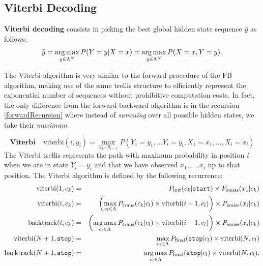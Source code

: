 %


\subsection{Viterbi Decoding}

\textbf{Viterbi decoding} consists in
picking the best global hidden state sequence 
$\widehat{y}$
as follows: 
\begin{equation}
\widehat{y} = \operatorname*{arg\,max}_{y \in \Lambda^N} P(Y=y|X=x) = \operatorname*{arg\,max}_{y \in \Lambda^N} P(X=x,Y=y).
\end{equation}

The Viterbi algorithm 
is very similar to the forward procedure of the FB algorithm,
making use of the same trellis structure to efficiently represent the exponential number of sequences without prohibitive computation costs. In fact, the only
difference from the forward-backward algorithm is in the recursion
\ref{forwardRecursion} where instead of \emph{summing} over all possible 
hidden states, we take their \emph{maximum}.

\begin{equation}
\label{eq::viterbi}
\mathbf{Viterbi }\;\;\;\;  \mathrm{viterbi}(i, y_i) = \max_{y_1...y_{i-1}} P(Y_1=y_1,\ldots Y_i = y_i , X_1=x_1,\ldots, X_i=x_i)
\end{equation}
The Viterbi trellis represents the path with maximum probability in
position
$i$ when we are in state $Y_i=y_i$ and that we have observed $x_1,\ldots,x_i$
up to that position. The Viterbi algorithm is defined by the
following recurrence: 
\begin{eqnarray}
\mathrm{viterbi}(1, c_k) &=& P_{\mathrm{init}}(c_k|\text{\tt start}) \times 
P_{\mathrm{emiss}}(x_1 | c_k)
 \\
 \mathrm{viterbi}(i, c_k) &=& \left( \displaystyle \max_{c_l \in \Lambda} P_{\mathrm{trans}}(c_k | c_l) \times \mathrm{viterbi}(i-1, c_l) \right) \times P_{\mathrm{emiss}}(x_i | c_k)  \label{viterbiRecursion}
 \\
 \mathrm{backtrack}(i, c_k) &=& \left( \displaystyle \operatorname*{arg\,max}_{c_l \in \Lambda} P_{\mathrm{trans}}(c_k | c_l) \times \mathrm{viterbi}(i-1, c_l) \right) \times P_{\mathrm{emiss}}(x_i | c_k) 
 \\
  \mathrm{viterbi}(N+1, \text{\tt stop}) &=& \max_{c_l \in \Lambda} P_{\mathrm{final}}(\text{\tt stop} | c_l) \times \mathrm{viterbi}(N, c_l)
 \\
  \mathrm{backtrack}(N+1, \text{\tt stop}) &=& \operatorname*{arg\,max}_{c_l \in \Lambda} P_{\mathrm{final}}(\text{\tt stop} | c_l) \times \mathrm{viterbi}(N, c_l).
\end{eqnarray}


